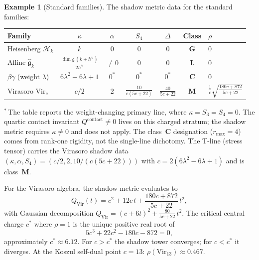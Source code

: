 \documentclass[11pt]{article}
\theoremstyle{plain}
\theoremstyle{definition}
\newtheorem{example}[theorem]{Example}
\theoremstyle{remark}
\begin{document}
\begin{example}[Standard families]
\label{ex:standard-families}
The shadow metric data for the standard families:
\begin{center}
\small
\renewcommand{\arraystretch}{1.3}
\begin{tabular}{lcccccl}
\toprule
Family & $\kappa$ & $\alpha$ & $S_4$ & $\Delta$ & Class
 & $\rho$ \\
\midrule
Heisenberg $\mathcal{H}_k$ & $k$ & $0$ & $0$ & $0$
 & $\mathbf{G}$ & $0$ \\
Affine $\widehat{\mathfrak{g}}_k$
 & $\frac{\dim\mathfrak{g}\,(k+h^\vee)}{2h^\vee}$ & $\neq 0$ & $0$
 & $0$ & $\mathbf{L}$ & $0$ \\
$\beta\gamma$ (weight $\lambda$) & $6\lambda^2{-}6\lambda{+}1$ & $0^*$ & $0^*$ & $0^*$
 & $\mathbf{C}$ & $0$ \\
Virasoro $\mathrm{Vir}_c$ & $c/2$ & $2$
 & $\frac{10}{c(5c+22)}$ & $\frac{40}{5c+22}$
 & $\mathbf{M}$ & $\frac{1}{c}\sqrt{\frac{180c+872}{5c+22}}$ \\
\bottomrule
\end{tabular}
\end{center}
\vspace{2pt}
\noindent
${}^*$\,The table reports the weight-changing primary line,
where $\kappa = S_3 = S_4 = 0$. The quartic contact
invariant $Q^{\mathrm{contact}} \neq 0$ lives on this
charged stratum; the shadow metric requires $\kappa \neq 0$
and does not apply. The class~$\mathbf{C}$ designation
($r_{\max} = 4$) comes from rank-one rigidity, not the
single-line dichotomy. The T-line (stress tensor) carries
the Virasoro shadow data $(\kappa, \alpha, S_4) = (c/2, 2,
10/(c(5c{+}22)))$ with $c = 2(6\lambda^2{-}6\lambda{+}1)$
and is class~$\mathbf{M}$.

For the Virasoro algebra, the shadow metric evaluates to
\[
 Q_{\mathrm{Vir}}(t) = c^2 + 12c\,t
 + \frac{180c + 872}{5c + 22}\,t^2,
\]
with Gaussian decomposition
$Q_{\mathrm{Vir}} = (c + 6t)^2 + \frac{80}{5c+22}\,t^2$.
The critical central charge $c^*$ where $\rho = 1$ is the
unique positive real root of
\[
 5c^3 + 22c^2 - 180c - 872 = 0,
\]
approximately $c^* \approx 6.12$. For $c > c^*$ the shadow
tower converges; for $c < c^*$ it diverges. At the Koszul
self-dual point $c = 13$: $\rho(\mathrm{Vir}_{13}) \approx 0.467$.
\end{example}
\end{document}
